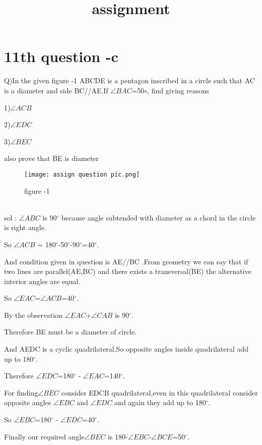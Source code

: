 \documentclass{article}
\title{assignment}
\begin{document}
\maketitle

\section{11th question -c}
Q)In the given figure -1 ABCDE is a pentagon inscribed in a circle such that AC is a diameter and side BC//AE.If $\angle BAC $=50$\circ$, find giving reasons

1)$\angle ACB $

2)$\angle EDC $

3)$\angle BEC $

also prove that BE is diameter

\begin{figure}
    \centering
    \texttt{[image: assign question pic.png]}
    \caption{figure -1}
    \label{fig:my_label}
\end{figure}\\

sol : $\angle ABC$ is 90$^\circ$ because angle subtended with diameter as a chord in the circle is right angle.

So $\angle ACB$ = 180$^\circ$-50$^\circ$-90$^\circ$=40$^\circ$.

       And condition given in question is AE//BC .From geometry we can say that if two lines are parallel(AE,BC) and there exists a transversal(BE) the alternative interior angles are equal.
       
       So $\angle EAC$=$\angle ACB$=40$^\circ$.
       
       By the observation $\angle EAC$+$\angle CAB$ is 90$^\circ$.
       
       Therefore BE must be a diameter of circle.
       
       And AEDC is a cyclic quadrilateral.So opposite angles inside quadrilateral
       add up to 180$^\circ$.
       
       Therefore $\angle EDC$=180$^\circ$ - $\angle EAC$=140$^\circ$.
       
       For finding$\angle BEC$  consider EDCB quadrilateral,even in this quadrilateral consider opposite angles $\angle EBC$ and $\angle EDC$ and again they add up to 180$^\circ$.
       
       
       So $\angle EBC$=180$^\circ$ - $\angle EDC$=40$^\circ$.
       
       
       Finally our required angle$\angle BEC$ is 180-$\angle EBC$-$\angle BCE$=50$^\circ$.
            
\end{document}
